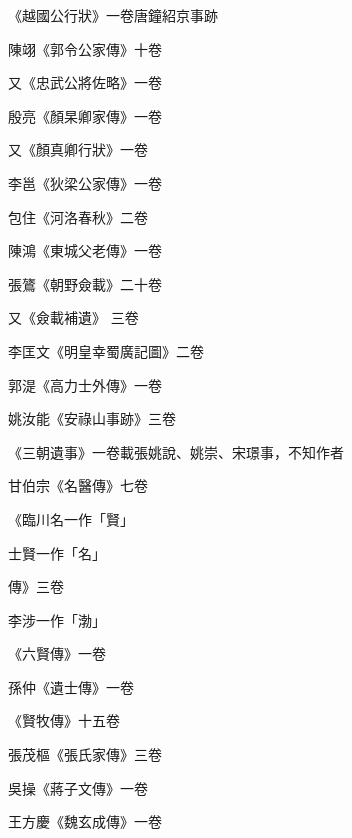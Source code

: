 \begin{pinyinscope}
 《越國公行狀》一卷唐鐘紹京事跡



 陳翊《郭令公家傳》十卷



 又《忠武公將佐略》一卷



 殷亮《顏杲卿家傳》一卷



 又《顏真卿行狀》一卷



 李邕《狄梁公家傳》一卷



 包住《河洛春秋》二卷



 陳鴻《東城父老傳》一卷



 張鷟《朝野僉載》二十卷



 又《僉載補遺》
 三卷



 李匡文《明皇幸蜀廣記圖》二卷



 郭湜《高力士外傳》一卷



 姚汝能《安祿山事跡》三卷



 《三朝遺事》一卷載張姚說、姚崇、宋璟事，不知作者



 甘伯宗《名醫傳》七卷



 《臨川名一作「賢」



 士賢一作「名」



 傳》三卷



 李涉一作「渤」



 《六賢傳》一卷



 孫仲《遺士傳》一卷



 《賢牧傳》十五卷



 張茂樞《張氏家傳》三卷



 吳操《蔣子文傳》一卷



 王方慶《魏玄成傳》一卷




\end{pinyinscope}

